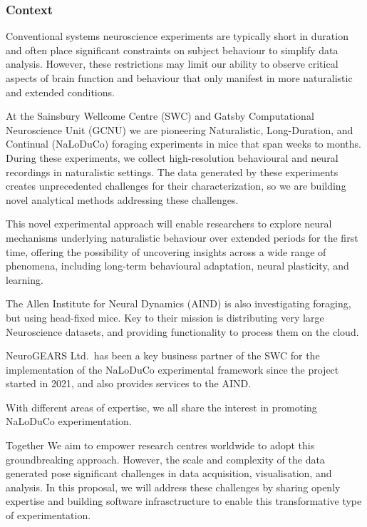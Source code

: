 \subsubsection{Context}

Conventional systems neuroscience experiments are typically short in duration
and often place significant constraints on subject behaviour to simplify data
analysis.
%
However, these restrictions may limit our ability to observe critical
aspects of brain function and behaviour that only manifest in more naturalistic
and extended conditions.

At the Sainsbury Wellcome Centre (SWC) and Gatsby Computational Neuroscience
Unit (GCNU) we are pioneering Naturalistic, Long-Duration, and Continual
(NaLoDuCo) foraging experiments in mice that span weeks to months. During these
experiments, we collect high-resolution behavioural and neural recordings in
naturalistic settings.
%
The data generated by these experiments creates unprecedented challenges for
their characterization, so we are building novel analytical methods addressing
these challenges.

This novel experimental approach will enable researchers to explore neural
mechanisms underlying naturalistic behaviour over extended periods for the first
time, offering the possibility of uncovering insights across a wide range of
phenomena, including long-term behavioural adaptation, neural plasticity, and
learning.
%

The Allen Institute for Neural Dynamics (AIND) is also investigating
foraging, but using head-fixed mice. Key to their mission is distributing very large Neuroscience datasets,
and providing functionality to process them on the cloud.

NeuroGEARS Ltd.\ has been a key business partner of the SWC for the
implementation of the NaLoDuCo experimental framework since the project started
in 2021, and also provides services to the AIND.

With different areas of expertise, we all share the interest in promoting NaLoDuCo experimentation.

Together We aim to empower research centres worldwide to adopt this groundbreaking
approach.
%
However, the scale and complexity of the data generated pose significant
challenges in data acquisition, visualisation, and analysis.
%
In this proposal, we will address these challenges by sharing openly expertise
and building software infrasctructure to enable this transformative type of
experimentation.

